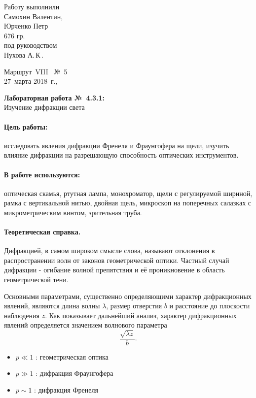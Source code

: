 \documentclass[12pt]{article}
\begin{document}
	\begin{minipage}{0.45\linewidth}
	Работу выполнили\\
	Самохин Валентин,\\
	Юрченко Петр\\ 676 гр.\\[2mm]
	под руководством\\
	Нухова А.\,К\,.
	\end{minipage}
	\hfill
	\begin{minipage}{0.45\linewidth}\flushright
		Маршрут~VIII \ №~5\\[3mm]
		27~марта 2018~г.,\\
		\end{minipage}
		
		\vspace{8mm}
		\begin{center}
			\textbf{\Large Лабораторная работа №~4.3.1:}\\[\parskip]
			\LARGE Изучение дифракции света
			\end{center}
			\vspace{0mm}
			\paragraph{Цель работы:}
				 исследовать явления дифракции Френеля и Фраунгофера на щели, изучить влияние дифракции на разрешающую способность оптических инструментов.
				

			
			\paragraph{В работе используются:}
			оптическая скамья, ртутная лампа, монохроматор, щели с регулируемой шириной, рамка с вертикальной нитью, двойная щель, микроскоп на поперечных салазках с микрометрическим винтом, зрительная труба.
			
			
			\vspace{2\parskip}
		\paragraph{Теоретическая справка.}
		Дифракцией, в самом широком смысле слова, называют отклонения
		в распространении волн от законов геометрической оптики. Частный
		случай дифракции - огибание волной препятствия и её проникновение
		в область геометрической тени.
		
		Основными параметрами, существенно определяющими характер дифракционных явлений, являются длина волны $\lambda$,
		размер отверстия $b$ и расстояние до плоскости наблюдения $z$. Как показывает дальнейший анализ, характер дифракционных явлений определяется значением волнового параметра
		$$\dfrac{\sqrt{\lambda z}}{b}.$$
		\begin{itemize}
			\item $p \ll 1$ : геометрическая оптика
			\item $p \gg 1$ : дифракция Фраунгофера
			\item $p \sim 1$ : дифракция Френеля
		\end{itemize}
	
\end{document}
